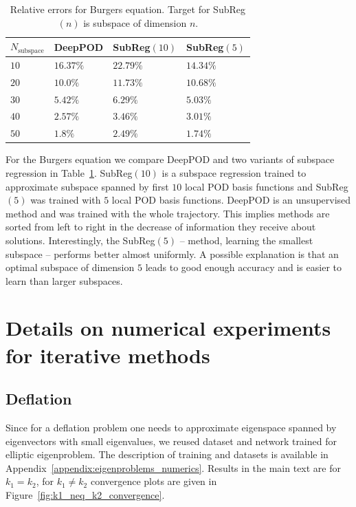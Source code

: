 \documentclass{article}
\begin{document}
\begin{table}
\caption{Relative errors for Burgers equation. Target for SubReg$(n)$ is subspace of dimension $n$.}
\label{table:Burgers_POD_subreg}
\begin{tabular}{llll}
\toprule
$N_{\text{subspace}}$ & DeepPOD & SubReg$(10)$ & SubReg$(5)$ \\
\midrule
$10$ & $16.37\%$ & $22.79\%$ & $14.34\%$\\
$20$ & $10.0\%$ & $11.73\%$ & $10.68\%$\\
$30$ & $5.42\%$ & $6.29\%$ & $5.03\%$\\
$40$ & $2.57\%$ & $3.46\%$ & $3.01\%$\\
$50$ & $1.8\%$ & $2.49\%$ & $1.74\%$\\
\bottomrule
\end{tabular}
\end{table}
For the Burgers equation we compare DeepPOD and two variants of subspace regression in Table~\ref{table:Burgers_POD_subreg}. SubReg$(10)$ is a subspace regression trained to approximate subspace spanned by first $10$ local POD basis functions and SubReg$(5)$ was trained with $5$ local POD basis functions. DeepPOD is an unsupervised method and was trained with the whole trajectory. This implies methods are sorted from left to right in the decrease of information they receive about solutions. Interestingly, the SubReg$(5)$ -- method, learning the smallest subspace -- performs better almost uniformly. A possible explanation is that an optimal subspace of dimension $5$ leads to good enough accuracy and is easier to learn than larger subspaces.

\section{Details on numerical experiments for iterative methods}
\label{appendix:iterative_numerics}

\subsection{Deflation}
Since for a deflation problem one needs to approximate eigenspace spanned by eigenvectors with small eigenvalues, we reused dataset and network trained for elliptic eigenproblem. The description of training and datasets is available in Appendix~\ref{appendix:eigenproblems_numerics}. Results in the main text are for $k_1 = k_2$, for $k_1 \neq k_2$ convergence plots are given in Figure~\ref{fig:k1_neq_k2_convergence}.
\end{document}

